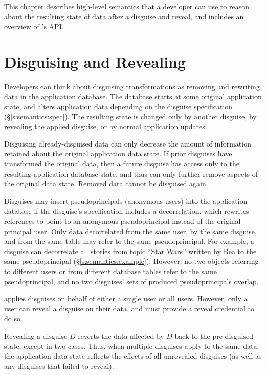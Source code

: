 This chapter describes  high-level semantics that a developer can use to
reason about the resulting state of data after a disguise and reveal, and 
includes an overview of \sys's API.

\section{Disguising and Revealing}
\label{s:semantics:hl}
Developers can think about disguising transformations as removing and rewriting
data in the application database.
%
The database starts at some original application state, and \sys alters
application data depending on the disguise specification
(\S\ref{s:semantics:spec}).  The resulting state is changed only by another
disguise, by revealing the applied disguise, or by normal application updates.
%

%
Disguising already-disguised data can only decrease the amount of information
retained about the original application data state. If prior disguises have
transformed the original data, then a future disguise has access only to the
resulting application database state, and thus can only further remove aspects
of the original data state.
%
Removed data cannot be disguised again. 
%

Disguises may insert pseudoprincipals (anonymous users) into the application
database if the disguise's specification includes a decorrelation, which
rewrites references to point to an anonymous pseudoprincipal instead of the
original principal user. 
%
Only data decorrelated from the same user, by the same disguise, and from the
same table may refer to the same pseudoprincipal.
%
For example, a disguise can decorrelate all stories from topic ``Star Wars''
written by Bea to the same pseudoprincipal (\S\ref{s:semantics:example}).
%
However, no two objects referring to different users or from different database
tables refer to the same pseudoprincipal, and no two disguises' sets of produced
pseudoprincipals overlap.
%

%
\sys applies disguises on behalf of either a single user or all users. However,
only a user can reveal a disguise on their data, and must provide a reveal
credential to do so.
%

%
Revealing a disguise $D$ reverts the data affected by $D$ back to the
pre-disguised state, except in two cases.  
%
%
%
Thus, when multiple disguises apply to the same data, the application data state
reflects the effects of all unrevealed disguises (as well as any disguises
that \sys failed
to reveal).
%

